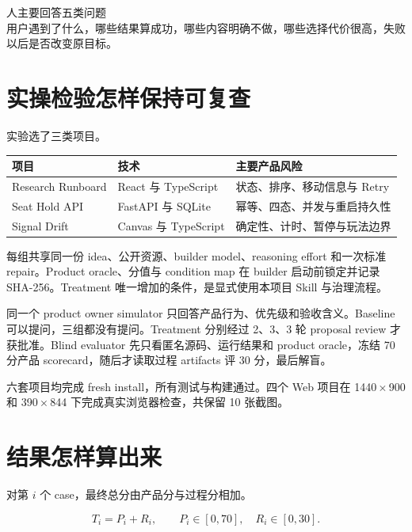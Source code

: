 \documentclass[11pt,fontset=fandol]{ctexart}
\begin{document}
\begin{keybox}\small
人主要回答五类问题\\
用户遇到了什么，哪些结果算成功，哪些内容明确不做，哪些选择代价很高，失败以后是否改变原目标。
\end{keybox}

\section{实操检验怎样保持可复查}

实验选了三类项目。

\begin{center}
\begin{tabular}{>{\raggedright\arraybackslash}p{}p{}p{}}
\toprule
项目 & 技术 & 主要产品风险 \\
\midrule
Research Runboard & React 与 TypeScript & 状态、排序、移动信息与 Retry \\
Seat Hold API & FastAPI 与 SQLite & 幂等、四态、并发与重启持久性 \\
Signal Drift & Canvas 与 TypeScript & 确定性、计时、暂停与玩法边界 \\
\bottomrule
\end{tabular}
\end{center}

每组共享同一份 idea、公开资源、builder model、reasoning effort 和一次标准 repair。Product oracle、分值与 condition map 在 builder 启动前锁定并记录 SHA-256。Treatment 唯一增加的条件，是显式使用本项目 Skill 与治理流程。

同一个 product owner simulator 只回答产品行为、优先级和验收含义。Baseline 可以提问，三组都没有提问。Treatment 分别经过 2、3、3 轮 proposal review 才获批准。Blind evaluator 先只看匿名源码、运行结果和 product oracle，冻结 70 分产品 scorecard，随后才读取过程 artifacts 评 30 分，最后解盲。

六套项目均完成 fresh install，所有测试与构建通过。四个 Web 项目在 1440\,$\times$\,900 和 390\,$\times$\,844 下完成真实浏览器检查，共保留 10 张截图。

\section{结果怎样算出来}

对第 $i$ 个 case，最终总分由产品分与过程分相加。

\begin{equation}
T_i=P_i+R_i,
\qquad P_i\in[0,70],\quad R_i\in[0,30].
\end{equation}
\end{document}
